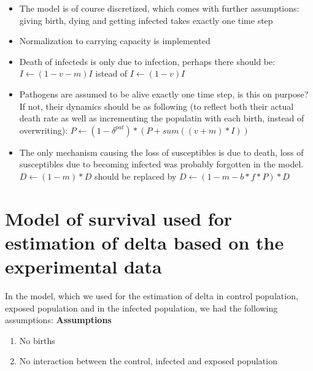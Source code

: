 \documentclass[10pt]{article}         %
\begin{document}
\begin{itemize}
	\item The model is of course discretized, which comes with further assumptions: giving birth, dying and getting infected takes exactly one time step
	\item Normalization to carrying capacity is implemented
	\item Death of infecteds is only due to infection, perhaps there should be:\newline $I \leftarrow (1-v-m)I$ istead of $I \leftarrow (1-v)I$
	\item Pathogens are assumed to be alive exactly one time step, is this on purpose? If not, their dynamics should be as following (to reflect both their actual death rate as well as incrementing the populatin with each birth, instead of overwriting): \newline
	$ P \leftarrow (1-\delta^{pat})*(P + sum((v+m)*I))$
	\item The only mechanism causing the loss of susceptibles is due to death, loss of susceptibles due to becoming infected was probably forgotten in the model. $ D \leftarrow (1-m)*D$ should be replaced by $ D \leftarrow (1-m-b*f*P)*D$
\end{itemize}
\newpage
\section{Model of survival used for estimation of delta based on the experimental data}

In the model, which we used for the estimation of delta in control population, exposed population and in the infected population, we had the following assumptions:\newline
\newline
\textbf{Assumptions}
\begin{enumerate}
	\item No births
	\item No interaction between the control, infected and exposed population
\end{enumerate}
\end{document}
